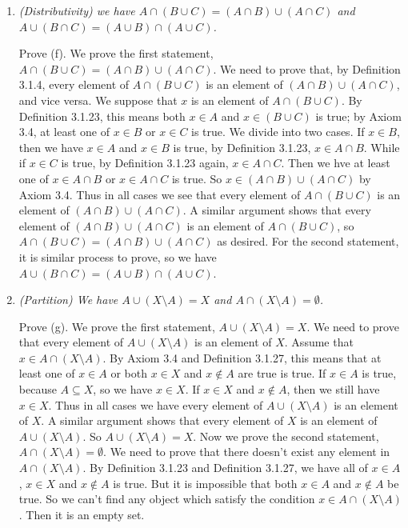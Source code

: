 \documentclass{book}
\begin{document}
\begin{enumerate}
    \item \emph{(Distributivity) we have $A\cap(B\cup C)=(A\cap B)\cup(A\cap C)$ and $A\cup(B\cap C)=(A\cup B)\cap(A\cup C)$.}

    Prove (f). We prove the first statement, $A\cap(B\cup C)=(A\cap B)\cup(A\cap C)$. We need to prove that, by Definition 3.1.4, every element of $A\cap(B\cup C)$ is an element of $(A\cap B)\cup(A\cap C)$, and vice versa. We suppose that $x$ is an element of $A\cap(B\cup C)$. By Definition 3.1.23, this means both $x\in A$ and $x\in (B\cup C)$ is true; by Axiom 3.4, at least one of $x\in B$ or $x\in C$ is true. We divide into two cases. If $x\in B$, then we have $x\in A$ and $x\in B$ is true, by Definition 3.1.23, $x\in A\cap B$. While if $x\in C$ is true, by Definition 3.1.23 again, $x\in A\cap C$. Then we hve at least one of $x\in A\cap B$ or $x\in A\cap C$ is true. So $x\in(A\cap B)\cup(A\cap C)$ by Axiom 3.4. Thus in all cases we see that every element of $A\cap(B\cup C)$ is an element of $(A\cap B)\cup(A\cap C)$. A similar argument shows that every element of $(A\cap B)\cup(A\cap C)$ is an element of $A\cap(B\cup C)$, so $A\cap(B\cup C)=(A\cap B)\cup(A\cap C)$ as desired. For the second statement, it is similar process to prove, so we have $A\cup(B\cap C)=(A\cup B)\cap(A\cup C)$.

    \item \emph{(Partition) We have $A\cup(X\setminus A)=X$ and $A\cap(X\setminus A)=\emptyset$.}

    Prove (g). We prove the first statement, $A\cup(X\setminus A)=X$. We need to prove that every element of $A\cup(X\setminus A)$ is an element of $X$. Assume that $x\in A\cap(X\setminus A)$. By Axiom 3.4 and Definition 3.1.27, this means that at least one of $x\in A$ or both $x\in X$ and $x\notin A$ are true is true. If $x\in A$ is true, because $A\subseteq X$, so we have $x\in X$. If $x\in X$ and $x\notin A$, then we still have $x\in X$. Thus in all cases we have every element of $A\cup(X\setminus A)$ is an element of $X$. A similar argument shows that every element of $X$ is an element of $A\cup(X\setminus A)$. So $A\cup(X\setminus A)=X$. Now we prove the second statement, $A\cap(X\setminus A)=\emptyset$. We need to prove that there doesn't exist any element in $A\cap(X\setminus A)$. By Definition 3.1.23 and Definition 3.1.27, we have all of $x\in A$, $x\in X$ and $x\notin A$ is true. But it is impossible that both $x\in A$ and $x\notin A$ be true. So we can't find any object which satisfy the condition $x\in A\cap(X\setminus A)$. Then it is an empty set.


\end{enumerate}
\end{document}
